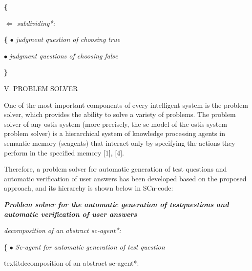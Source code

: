 \documentclass{article}
\begin{document}
\begin{multicols}{2}

\hspace{7mm} \textbf{\{}

$\Leftarrow$ 
\hspace{1.5mm} \textit{ subdividing*: }

\hspace{7mm} \textbf{\{} $\bullet$
\hspace{5mm} \textit{judgment question of choosing true}

\hspace{10mm} $\bullet$
\hspace{5mm} \textit{judgment questions of choosing false}

\hspace{7mm} \textbf{\}}



   \begin{center}
    V. PROBLEM SOLVER
\end{center}
\vspace{-0.3cm}
One of the most important components of every intelligent system is the problem solver, which provides the ability to solve a variety of problems. The problem solver of any ostis-system (more precisely, the sc-model of the ostis-system problem solver) is a hierarchical system of knowledge processing agents in semantic memory (scagents) that interact only by specifying the actions they perform in the specified memory [1], [4].

Therefore, a problem solver for automatic generation of test questions and automatic verification of user answers has been developed based on the proposed approach, and its hierarchy is shown below in SCn-code:
\vspace{0.4cm}

\textit{\textbf{Problem solver for the automatic generation of testquestions and automatic verification of user answers}}

\begin{description}[ labelwidth=0.75cm]

\vspace{-0.3cm}

\item[$\Leftarrow$] \textit{decomposition of an abstract sc-agent*:}

\{ $\bullet$ \hspace{14pt} \textit{Sc-agent for automatic generation of test
question}
\begin{description}[ labelwidth=1.2cm, itemsep=-1.5mm]
\vspace{-0.3cm}
\item[$\Leftarrow$] textit{decomposition of an abstract sc-agent*: }


\end{description}
\end{description}
\end{multicols}
\end{document}
